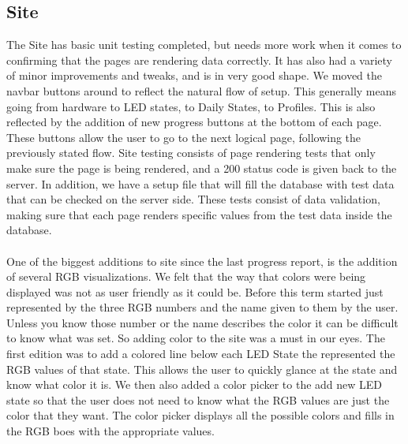 \documentclass[onecolumn, draftclsnofoot,10pt, compsoc]{IEEEtran}
\begin{document}
	\subsection{Site}
		\noindent The Site has basic unit testing completed, but needs more work when it comes to confirming that the pages are rendering data correctly.
		It has also had a variety of minor improvements and tweaks, and is in very good shape. We moved the navbar buttons around to reflect the natural
		flow of setup. This generally means going from hardware to LED states, to Daily States, to Profiles. This is also reflected by the addition of new
		progress buttons at the bottom of each page. These buttons allow the user to go to the next logical page, following the previously stated flow.
		Site testing consists of page rendering tests that only make sure the page is being rendered, and a 200 status code is given back to the server.
		In addition, we have a setup file that will fill the database with test data that can be checked on the server side. These tests consist of data
		validation, making sure that each page renders specific values from the test data inside the database.
	  	\\\\
		\noindent One of the biggest additions to site since the last progress report, is the addition of several RGB visualizations. We felt that the way that colors were being displayed was not as user friendly as it could be. Before this term started just represented by the three RGB numbers and the name given to them by the user. Unless you know those number or the name describes the color it can be difficult to know what was set. So adding color to the site was a must in our eyes. The first edition was to add a colored line below each LED State the represented the RGB values of that state. This allows the user to quickly glance at the state and know what color it is. We then also added a color picker to the add new LED state so that the user does not need to know what the RGB values are just the color that they want. The color picker displays all the possible colors and fills in the RGB boes with the appropriate values.
\end{document}
